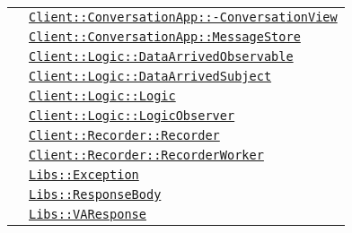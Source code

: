 \begin{longtable}{|>{\centering}m{3cm}|m{10cm}<{\centering}|}
& \hyperref[Client::ConversationApp::ConversationView]{\texttt{Client::ConversationApp::-\linebreak ConversationView}}\\
& \hyperref[Client::ConversationApp::MessageStore]{\texttt{Client::ConversationApp::MessageStore}}\\
& \hyperref[Client::Logic::DataArrivedObservable]{\texttt{Client::Logic::DataArrivedObservable}}\\
& \hyperref[Client::Logic::DataArrivedSubject]{\texttt{Client::Logic::DataArrivedSubject}}\\
& \hyperref[Client::Logic::Logic]{\texttt{Client::Logic::Logic}}\\
& \hyperref[Client::Logic::LogicObserver]{\texttt{Client::Logic::LogicObserver}}\\
& \hyperref[Client::Recorder::Recorder]{\texttt{Client::Recorder::Recorder}}\\
& \hyperref[Client::Recorder::RecorderWorker]{\texttt{Client::Recorder::RecorderWorker}}\\
& \hyperref[Libs::Exception]{\texttt{Libs::Exception}}\\
& \hyperref[Libs::ResponseBody]{\texttt{Libs::ResponseBody}}\\
& \hyperref[Libs::VAResponse]{\texttt{Libs::VAResponse}}\\ \hline


\end{longtable}
